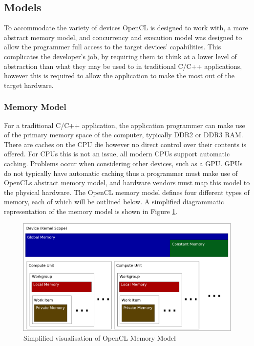 \subsection{Models}

To accommodate the variety of devices OpenCL is designed to work with, a more
abstract memory model, and concurrency and execution model was designed to allow
the programmer full access to the target devices' capabilities. This complicates
the developer's job, by requiring them to think at a lower level of abstraction
than what they may be used to in traditional C/C++ applications, however this is
required to allow the application to make the most out of the target hardware.

\subsubsection{Memory Model}

For a traditional C/C++ application, the application programmer can make use of
the primary memory space of the computer, typically DDR2 or DDR3 RAM. There are
caches on the CPU die however no direct control over their contents is offered.
For CPUs this is not an issue, all modern CPUs support automatic caching.
Problems occur when considering other devices, such as a GPU. GPUs do not
typically have automatic caching thus a programmer must make use of OpenCLs
abstract memory model, and hardware vendors must map this model to the physical
hardware. The OpenCL memory model defines four different types of memory, each
of which will be outlined below. A simplified diagrammatic representation of the
memory model is shown in Figure \ref{fig:openCLMemoryModel}.

\begin{figure}
\includegraphics[width=\linewidth]{images/openCLMemoryModel.png}
\caption{Simplified visualisation of OpenCL Memory Model}
\label{fig:openCLMemoryModel}
\end{figure}


